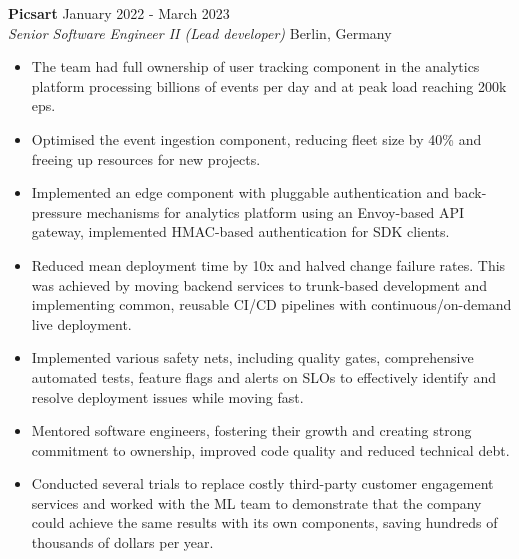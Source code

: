 \documentclass[a4paper]{article}
\newcommand{\employer} [4] {
    \textbf{#1} \hfill {#3} \\
    \textit{#2} \hfill {#4} \\
    \vspace{0mm}
}
\begin{document}
    \employer{Picsart}{Senior Software Engineer II (Lead developer)}{January 2022 - March 2023}{Berlin, Germany}
    \begin{itemize}[itemsep=-1mm]
        \item The team had full ownership of user tracking component in the analytics platform processing billions
        of events per day and at peak load reaching 200k eps.
        \item Optimised the event ingestion component, reducing fleet size by 40\% and freeing up resources for new projects.
        \item Implemented an edge component with pluggable authentication and back-pressure mechanisms for analytics platform
        using an Envoy-based API gateway, implemented HMAC-based authentication for SDK clients.
        \item Reduced mean deployment time by 10x and halved change failure rates.
        This was achieved by moving backend services to trunk-based development and implementing common, reusable CI/CD pipelines with
        continuous/on-demand live deployment.
        \item Implemented various safety nets, including quality gates, comprehensive automated tests,
        feature flags and alerts on SLOs to effectively identify and resolve deployment issues while moving fast.
        \item Mentored software engineers, fostering their growth and creating strong commitment to ownership,
        improved code quality and reduced technical debt.
        \item Conducted several trials to replace costly third-party customer engagement services
        and worked with the ML team to demonstrate that the company could achieve the same results with its own components,
        saving hundreds of thousands of dollars per year.
    \end{itemize}
\end{document}
